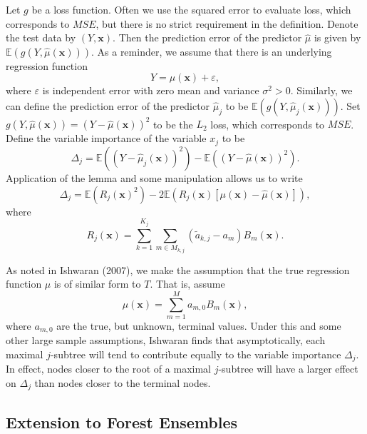 \documentclass[12pt,twoside]{reedthesis}
\theoremstyle{definition}
\theoremstyle{definition}
\theoremstyle{definition}
\theoremstyle{remark}
\begin{document}
Let \(g\) be a loss function. Often we use the squared error to evaluate
loss, which corresponds to \(MSE\), but there is no strict requirement
in the definition. Denote the test data by \((Y,\mathbf{x})\). Then the
prediction error of the predictor \(\hat{\mu}\) is given by
\(\mathbb{E}(g(Y,\hat{\mu}(\mathbf{x})))\). As a reminder, we assume
that there is an underlying regression function
\[Y=\mu(\mathbf{x})+\varepsilon,\] where \(\varepsilon\) is independent
error with zero mean and variance \(\sigma^2>0\). Similarly, we can
define the prediction error of the predictor \(\hat{\mu}_j\) to be
\(\mathbb{E}(g(Y,\hat{\mu}_j(\mathbf{x}))).\) Set
\(g(Y,\hat{\mu}(\mathbf{x}))=(Y-\hat{\mu}(\mathbf{x}))^2\) to be the
\(L_2\) loss, which corresponds to \(MSE\). Define the variable
importance of the variable \(x_j\) to be
\[\Delta_j=\mathbb{E}((Y-\hat{\mu}_j(\mathbf{x}))^2)-\mathbb{E}((Y-\hat{\mu}(\mathbf{x}))^2).\]
Application of the lemma and some manipulation allows us to write
\[\Delta_j=\mathbb{E}(R_j(\mathbf{x})^2)-2\mathbb{E}\left(R_j(\mathbf{x})[\mu(\mathbf{x})-\hat{\mu}(\mathbf{x})]\right),\]
where
\[R_j(\mathbf{x})=\sum_{k=1}^{K_j}\sum_{m\in M_{k,j}} (\tilde{a}_{k,j} -a_m)B_m(\mathbf{x}).\]
\par

As noted in Ishwaran (2007), we make the assumption that the true
regression function \(\mu\) is of similar form to \(T\). That is, assume
\[\mu(\mathbf{x})=\sum_{m=1}^M a_{m,0} B_m(\mathbf{x}),\] where
\(a_{m,0}\) are the true, but unknown, terminal values. Under this and
some other large sample assumptions, Ishwaran finds that asymptotically,
each maximal \(j\)-subtree will tend to contribute equally to the
variable importance \(\Delta_j\). In effect, nodes closer to the root of
a maximal \(j\)-subtree will have a larger effect on \(\Delta_j\) than
nodes closer to the terminal nodes. \par

\subsection{Extension to Forest
Ensembles}\label{extension-to-forest-ensembles}
\end{document}
